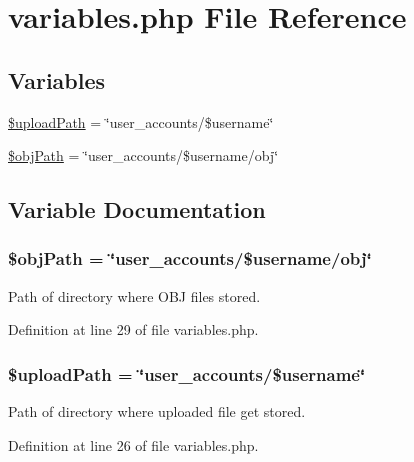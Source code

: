 \hypertarget{variables_8php}{\section{variables.\-php File Reference}
\label{variables_8php}
}
\subsection*{Variables}
\begin{DoxyCompactItemize}
\item 
\hyperlink{variables_8php_a9b2aca73038168dc85a3fb6d6af948a8}{\$upload\-Path} = \char`\"{}user\-\_\-accounts/\$username\char`\"{}
\item 
\hyperlink{variables_8php_a107cb3732c3eb625a67c9896596c6c74}{\$obj\-Path} = \char`\"{}user\-\_\-accounts/\$username/obj\char`\"{}
\end{DoxyCompactItemize}


\subsection{Variable Documentation}
\hypertarget{variables_8php_a107cb3732c3eb625a67c9896596c6c74}{
\subsubsection[{\$obj\-Path}]{\setlength{\rightskip}{0pt plus 5cm}\$obj\-Path = \char`\"{}user\-\_\-accounts/\$username/obj\char`\"{}}}\label{variables_8php_a107cb3732c3eb625a67c9896596c6c74}
Path of directory where O\-B\-J files stored. 

Definition at line 29 of file variables.\-php.

\hypertarget{variables_8php_a9b2aca73038168dc85a3fb6d6af948a8}{
\subsubsection[{\$upload\-Path}]{\setlength{\rightskip}{0pt plus 5cm}\$upload\-Path = \char`\"{}user\-\_\-accounts/\$username\char`\"{}}}\label{variables_8php_a9b2aca73038168dc85a3fb6d6af948a8}
Path of directory where uploaded file get stored. 

Definition at line 26 of file variables.\-php.

